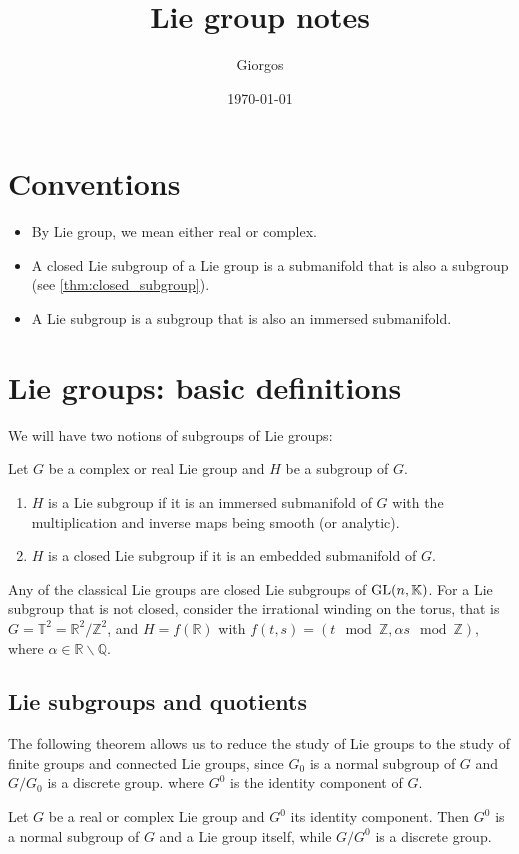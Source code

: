 \documentclass{report}
\title{Lie group notes}
\author{Giorgos}
\date{\today}
\begin{document}
\maketitle

\tableofcontents

\chapter*{Conventions}
\begin{itemize}
    \item By Lie group, we mean either real or complex.
    \item A closed Lie subgroup of a Lie group is a submanifold that is also a subgroup (see \cref{thm:closed_subgroup}). 
    \item A Lie subgroup is a subgroup that is also an immersed submanifold.
\end{itemize}

\chapter{Lie groups: basic definitions}
We will have two notions of subgroups of Lie groups:
\begin{definition}
    Let $G$ be a complex or real Lie group and $H$ be a subgroup of $G$.
    \begin{enumerate}[label = (\roman*)]
        \item $H$ is a Lie subgroup if it is an immersed submanifold of $G$ with the multiplication and inverse maps being smooth (or analytic).
        \item $H$ is a closed Lie subgroup if it is an embedded submanifold of $G$.
    \end{enumerate}
\end{definition}
\begin{example}
    Any of the classical Lie groups are closed Lie subgroups of $\operatorname{{\mathrm{GL}}}(n, \mathbb K)$.
    For a Lie subgroup that is not closed, consider the irrational winding on the torus, that is $G = \mathbb T^2 = \mathbb R^2/\mathbb Z^2$, and $H = f(\mathbb R)$ with $f(t,s) = (t \mod \mathbb Z, \alpha s \mod \mathbb Z)$, where $\alpha \in \mathbb R\backslash \mathbb Q$.
\end{example}
\section{Lie subgroups and quotients}
The following theorem allows us to reduce the study of Lie groups to the study of finite groups and connected Lie groups, since $G_0$ is a normal subgroup of $G$ and $G/G_0$ is a discrete group.
where $G^0$ is the identity component of $G$.
\begin{theorem}
    Let $G$ be a real or complex Lie group and $G^0$ its identity component.
    Then $G^0$ is a normal subgroup of $G$ and a Lie group itself, while $G/G^0$ is a discrete group.
\end{theorem}
\end{document}
